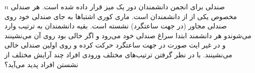 \EXERCISE
$n$
 صندلی برای انجمن دانشمندان دور یک میز قرار داده شده است. هر صندلی مخصوص یکی از از دانشمندان است. ماری کوری اشتباها به جای صندلی خود روی صندلی مجاور (در جهت ساعتگرد) نشسته است. بقیه دانشمندان به ترتیب وارد می‌شوندو هر دانشمند ابتدا سراغ صندلی خود می‌رود و اگر خالی بود روی آن می‌نشینند و در غیر ایت صورت در جهت ساعتگرد حرکت کرده  و روی اولین صندلی خالی می‌نشینند. با در نظر گرفتن ترتیب‌های مختلف ورودی افراد چند آرایش مختلف از نشستن افراد پدید می‌آید؟